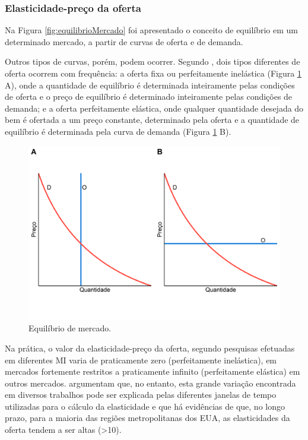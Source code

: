 \documentclass[
	12pt,				%
	oneside,			%
	a4paper,			%
	chapter=TITLE,		%
	section=TITLE,		%
	english,			%
	brazil				%
	]{abntex2}
\begin{document}
\hypertarget{elasticidade-preuxe7o-da-oferta}{%
\subsubsection{Elasticidade-preço da oferta}\label{elasticidade-preuxe7o-da-oferta}}

Na Figura \ref{fig:equilibrioMercado} foi apresentado o conceito de equilíbrio
em um determinado mercado, a partir de curvas de oferta e de demanda.

Outros tipos de curvas, porém, podem ocorrer. Segundo \textcite[p.~311-312]{varian}, dois
tipos diferentes de oferta ocorrem com frequência: a oferta fixa ou
perfeitamente inelástica (Figura \ref{fig:casosEspeciais} A), onde a quantidade
de equilíbrio é determinada inteiramente pelas condições de oferta e o preço de
equilíbrio é determinado inteiramente pelas condições de demanda; e a oferta
perfeitamente elástica, onde qualquer quantidade desejada do bem é ofertada a um
preço constante, determinado pela oferta e a quantidade de equilíbrio é
determinada pela curva de demanda (Figura \ref{fig:casosEspeciais} B).
\begin{figure}[H]

{\centering \includegraphics[width=1\linewidth]{images/casosEspeciais-1} 

}

\caption{Equilíbrio de mercado.}\label{fig:casosEspeciais}
\end{figure}
Na prática, o valor da elasticidade-preço da oferta, segundo pesquisas efetuadas
em diferentes \gls{MI} varia de praticamente zero (perfeitamente inelástica), em
mercados fortemente restritos \autocite{malaysia} a praticamente infinito (perfeitamente
elástica) em outros mercados. \textcite{supplyelasticity} argumentam que, no entanto, esta
grande variação encontrada em diversos trabalhos pode ser explicada pelas
diferentes janelas de tempo utilizadas para o cálculo da elasticidade e que há
evidências de que, no longo prazo, para a maioria das regiões metropolitanas dos
EUA, as elasticidades da oferta tendem a ser altas (\textgreater10).
\end{document}
